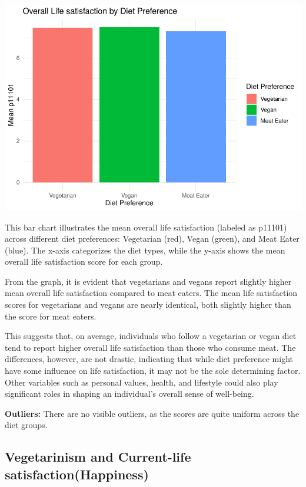 \documentclass[
]{article}
\begin{document}
\includegraphics{Final-v2_files/figure-latex/Overall satisfaction ~analysis-1.pdf}

This bar chart illustrates the mean overall life satisfaction (labeled
as p11101) across different diet preferences: Vegetarian (red), Vegan
(green), and Meat Eater (blue). The x-axis categorizes the diet types,
while the y-axis shows the mean overall life satisfaction score for each
group.

From the graph, it is evident that vegetarians and vegans report
slightly higher mean overall life satisfaction compared to meat eaters.
The mean life satisfaction scores for vegetarians and vegans are nearly
identical, both slightly higher than the score for meat eaters.

This suggests that, on average, individuals who follow a vegetarian or
vegan diet tend to report higher overall life satisfaction than those
who consume meat. The differences, however, are not drastic, indicating
that while diet preference might have some influence on life
satisfaction, it may not be the sole determining factor. Other variables
such as personal values, health, and lifestyle could also play
significant roles in shaping an individual's overall sense of
well-being.

\textbf{Outliers:} There are no visible outliers, as the scores are
quite uniform across the diet groups.

\subsection{Vegetarinism and Current-life
satisfaction(Happiness)}\label{vegetarinism-and-current-life-satisfactionhappiness}
\end{document}
